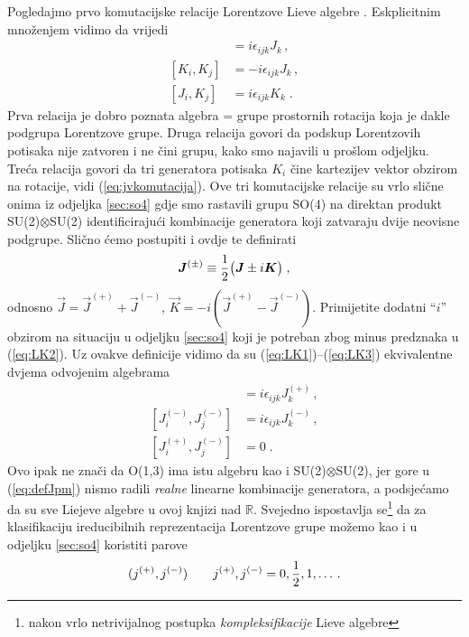 Pogledajmo prvo komutacijske relacije Lorentzove Lieve algebre . Eskplicitnim
množenjem vidimo da vrijedi
\begin{align}
[J_i, J_j] &= i\epsilon_{ijk} J_k  \,, \label{eq:LK1}\\
[K_i, K_j] &= -i\epsilon_{ijk} J_k \,, \label{eq:LK2} \\
[J_i, K_j] &= i\epsilon_{ijk} K_k \;. \label{eq:LK3}
\end{align}
Prva relacija je dobro poznata algebra = grupe prostornih rotacija
koja je dakle podgrupa Lorentzove grupe.
Druga relacija govori da podskup Lorentzovih potisaka nije zatvoren
i ne čini grupu, kako smo najavili u prošlom odjeljku. Treća
relacija govori da tri generatora potisaka $K_i$ čine kartezijev vektor obzirom
na rotacije, vidi (\ref{eq:jvkomutacija}).
Ove tri komutacijske relacije su vrlo slične onima iz odjeljka \ref{sec:so4} gdje smo 
rastavili grupu SO(4) na direktan produkt SU(2)$\otimes$SU(2) identificirajući
kombinacije generatora koji zatvaraju dvije neovisne podgrupe.
Slično ćemo postupiti i ovdje te definirati
\begin{equation}
  \vec{J}^{(\pm)} \equiv \fhalf \big(\vec{J}\pm i \vec{K} \big) \;,
  \label{eq:defJpm}
\end{equation}
odnosno $\vec{J}=\vec{J}^{(+)}+\vec{J}^{(-)}$, $\vec{K} = -i
(\vec{J}^{(+)}-\vec{J}^{(-)})$. Primijetite dodatni ``$i$'' obzirom
na situaciju u odjeljku \ref{sec:so4} koji je potreban zbog
minus predznaka u (\ref{eq:LK2}).
Uz ovakve definicije vidimo da su (\ref{eq:LK1})--(\ref{eq:LK3}) ekvivalentne
dvjema odvojenim  algebrama
\begin{align}
[J_{i}^{(+)}, J_{j}^{(+)}] &= i \epsilon_{ijk} J_{k}^{(+)} \,, \\
[J_{i}^{(-)}, J_{j}^{(-)}] &= i \epsilon_{ijk} J_{k}^{(-)} \,, \\
[J_{i}^{(+)}, J_{j}^{(-)}] &= 0  \;.
\end{align}
Ovo ipak ne znači  da O(1,3) ima istu algebru kao i SU(2)$\otimes$SU(2),
jer gore u (\ref{eq:defJpm})  nismo radili \emph{realne} linearne kombinacije generatora,
a podsjećamo da su sve Liejeve algebre u ovoj knjizi nad $\mathbb{R}$.
Svejedno ispostavlja se\footnote{nakon vrlo netrivijalnog postupka \emph{kompleksifikacije}
Lieve algebre} da za klasifikaciju ireducibilnih reprezentacija Lorentzove
grupe možemo kao i u odjeljku \ref{sec:so4} koristiti parove
\begin{equation}
(j^{(+)}, j^{(-)})  \qquad j^{(+)}, j^{(-)} = 0, \frac{1}{2}, 1, \dotsc .
\end{equation}
